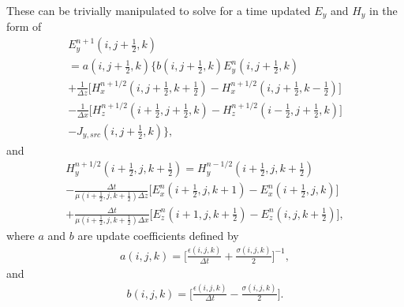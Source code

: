 These can be trivially manipulated to solve for a time updated $E_y$ and $H_y$ in the form of
\begin{multline}
	E_y^{n+1}(i,j+\tfrac{1}{2},k)\\ 
	=a(i,j+\tfrac{1}{2},k) \bigg\{b(i,j+\tfrac{1}{2},k)E_y^{n}(i,j+\tfrac{1}{2},k) \\
	 +\frac{1}{\Delta z}\bigg[H_x^{n+1/2}(i,j+\tfrac{1}{2},k+\tfrac{1}{2})-H_x^{n+1/2}(i,j+\tfrac{1}{2},k-\tfrac{1}{2}) \bigg] \\
	 -\frac{1}{\Delta x} \bigg[H_z^{n+1/2}(i+\tfrac{1}{2},j+\tfrac{1}{2},k)-H_z^{n+1/2}(i-\tfrac{1}{2},j+\tfrac{1}{2},k)\bigg] \\
	 -J_{y,src}(i,j+\tfrac{1}{2},k)
	 \bigg\},
	\label{eq:ey-update}
\end{multline}
and
\begin{multline}
	H_y^{n+1/2}(i+\tfrac{1}{2},j,k+\tfrac{1}{2}) = H_y^{n-1/2}(i+\tfrac{1}{2},j,k+\tfrac{1}{2}) \\ 
	-\frac{\Delta t}{\mu(i+\tfrac{1}{2},j,k+\tfrac{1}{2})\Delta z}\bigg[E_x^n(i+\tfrac{1}{2},j,k+1)-E_x^n(i+\tfrac{1}{2},j,k)\bigg] \\
	+\frac{\Delta t}{\mu(i+\tfrac{1}{2},j,k+\tfrac{1}{2})\Delta x}\bigg[E_z^n(i+1,j,k+\tfrac{1}{2})-E_z^n(i,j,k+\tfrac{1}{2})\bigg],
	\label{eq:hy-update}
\end{multline}
where $a$ and $b$ are update coefficients defined by
\begin{align}
	a(i,j,k) = \bigg[\frac{\epsilon(i,j,k)}{\Delta t}+\frac{\sigma(i,j,k)}{2}\bigg]^{-1},
	\label{eq:a}
\end{align}
and
\begin{align}
	b(i,j,k) = \bigg[\frac{\epsilon(i,j,k)}{\Delta t}-\frac{\sigma(i,j,k)}{2}\bigg].
	\label{eq:b}
\end{align}

